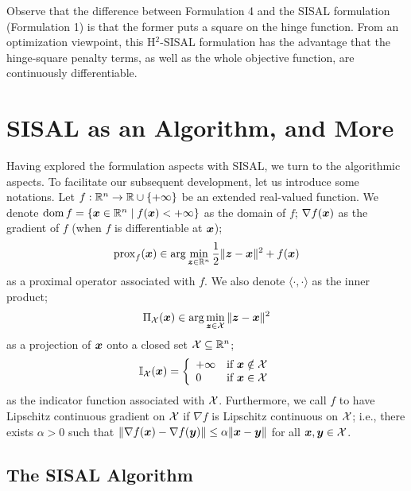 \documentclass[10pt,twocolumn,twoside]{IEEEtran}
\begin{document}
Observe that the difference between Formulation 4 and the SISAL formulation (Formulation 1) is that the former puts a square on the hinge function.
From an optimization viewpoint,  this H$^2$-SISAL formulation has the advantage that the hinge-square penalty terms, as well as the whole objective function, are continuously differentiable.



\section{SISAL as an Algorithm, and More}

Having explored the formulation aspects with SISAL, we turn to the algorithmic aspects.
To facilitate our subsequent development, let us introduce some notations.
Let $f: \mathbb{R}^n \rightarrow \mathbb{R} \cup \{ + \infty \}$ be an extended real-valued function.
We denote
${\rm dom}\, f = \{ {\bm x} \in \mathbb{R}^n \mid f({\bm x}) < +\infty \}$ as the domain of $f$;
$\nabla f({\bm x})$ as the gradient of $f$ (when $f$ is differentiable at ${\bm x}$);
\[
{\rm prox}_f({\bm x}) \in \arg \min_{{\bm z} \in \mathbb{R}^n } \frac{1}{2} \| {\bm z} - {\bm x} \|^2 + f({\bm x})
\]
as a proximal operator associated with $f$.
We also denote $\langle \cdot, \cdot \rangle$ as the inner product;
\[
\Pi_{\mathcal{X}}({\bm x}) \in \arg \min_{{\bm z} \in \mathcal{X}} \| {\bm z} - {\bm x} \|^2
\]
as a projection of ${\bm x}$ onto a closed set $\mathcal{X} \subseteq \mathbb{R}^n$;
\[
\mathbb{I}_{\mathcal{X}}({\bm x}) = \left\{ \begin{array}{ll} +\infty & \text{if ${\bm x} \notin \mathcal{X}$} \\ 0 & \text{if ${\bm x} \in \mathcal{X}$} \end{array} \right.
\]
as the indicator function associated with $\mathcal{X}$. Furthermore, we call $ f $ to have Lipschitz continuous gradient on $\mathcal{X} $ if $ \nabla f $ is Lipschitz continuous on $\mathcal{X}$; i.e., there exists $ \alpha > 0 $ such that $ \| \nabla f({\bm x}) - \nabla f({\bm y})\| \leq \alpha \| {\bm x} - {\bm y} \| $ for all $ {\bm x}, {\bm y} \in \mathcal{X} $.


\subsection{The SISAL Algorithm}
\end{document}
